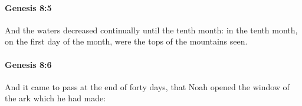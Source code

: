 		\paragraph{Genesis 8:5} %
			\label{GENESIS-8-5}

			And the waters decreased continually until the tenth month: in the tenth month, on the first day of the month, were the tops of the mountains seen.


		\paragraph{Genesis 8:6} %
			\label{GENESIS-8-6}

			And it came to pass at the end of forty days, that Noah opened the window of the ark which he had made:


